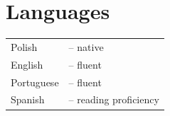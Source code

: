 \documentclass{resume}
\begin{document}
\section{Languages}
\begin{content}
  \begin{tabular}{@{}l l@{}}
    Polish       & -- native \\
    English      & -- fluent \\
    Portuguese   & -- fluent \\
    Spanish      & -- reading proficiency \\
  \end{tabular}
\sectionlineskip
\end{content}

\end{document}
